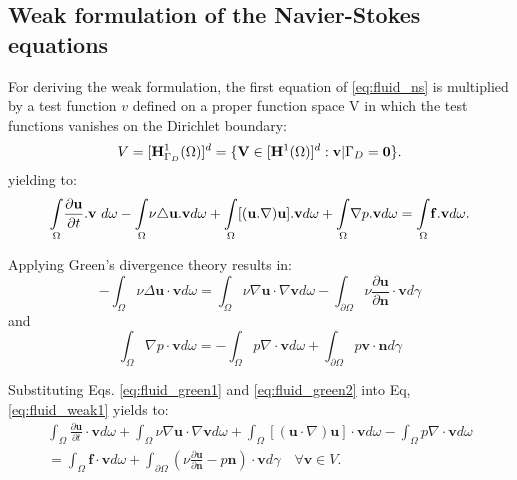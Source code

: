 \subsection{Weak formulation of the Navier-Stokes equations} \label{sec:fluid_weak}

For deriving the weak formulation, the first equation of \ref{eq:fluid_ns} is multiplied by a test function $v$ defined on a proper function space V in which the test functions vanishes on the Dirichlet boundary:
\begin{equation} \label{eq:fluid_space_v}
V = [{\bf H}^{1}_{\Gamma_{D}}(\Omega)]^{d} = \lbrace{\bf V} \in [{\bf H}^{1}(\Omega)]^{d} : {\bf v}|\Gamma_{D} = {\bf 0}\rbrace.
\end{equation}
yielding to:
\begin{equation} \label{eq:fluid_weak1}
{\mathop{\int}_{\Omega}} {\partial {\bf u} \over \partial t}.{\bf v}\ d\omega- {\mathop{\int}_{\Omega}}\nu\triangle{\bf u.v}d\omega+ {\mathop{\int}_{\Omega}}[({\bf u.\nabla){\bf u].{\bf v}}}d\omega+ {\mathop{\int}_{\Omega}}\nabla p.{\bf v}d\omega= {\mathop{\int}_{\Omega}}{\bf f. v}d\omega.
\end{equation}

\noindent Applying Green's divergence theory results in:
\begin{equation} \label{eq:fluid_green1}
-\int_{\Omega} \nu \Delta \mathbf{u} \cdot \mathbf{v} d \omega=\int_{\Omega} \nu \nabla \mathbf{u} \cdot \nabla \mathbf{v} d \omega-\int_{\partial \Omega} \nu \frac{\partial \mathbf{u}}{\partial \mathbf{n}} \cdot \mathbf{v} d \gamma
\end{equation}
and
\begin{equation} \label{eq:fluid_green2}
\int_{\Omega} \nabla p \cdot \mathbf{v} d \omega=-\int_{\Omega} p \nabla\cdot \mathbf{v} d \omega+\int_{\partial \Omega} p \mathbf{v} \cdot \mathbf{n} d \gamma
\end{equation}

\noindent Substituting Eqs. \ref{eq:fluid_green1} and \ref{eq:fluid_green2} into Eq, \ref{eq:fluid_weak1} yields to:
\begin{equation} \label{eq:fluid_ns_weak}
\begin{array}{r}
\displaystyle\int_{\Omega} \frac{\partial \mathbf{u}}{\partial t} \cdot \mathbf{v} d \omega+\int_{\Omega} \nu \nabla \mathbf{u} \cdot \nabla \mathbf{v} d \omega+\int_{\Omega}[(\mathbf{u} \cdot \nabla) \mathbf{u}] \cdot \mathbf{v} d \omega-\int_{\Omega} p \nabla\cdot \mathbf{v} d \omega \\
\displaystyle=\int_{\Omega} \mathbf{f} \cdot \mathbf{v} d \omega+\int_{\partial \Omega}\left(\nu \frac{\partial \mathbf{u}}{\partial \mathbf{n}}-p \mathbf{n}\right) \cdot \mathbf{v} d \gamma \quad \forall \mathbf{v} \in V .
\end{array}
\end{equation}

